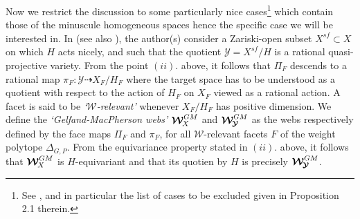 \documentclass[11pt]{amsart}
\newcommand{\sk}{\smallskip}
\begin{document}
Now we restrict the discussion to some particularly nice cases\footnote{See \cite{Skorobogatov}, and in particular the list of cases to be excluded given in Proposition 2.1 therein.} which contain those of the minuscule homogeneous spaces hence the specific case we will be interested in.  In \cite{Skorobogatov} (see also \cite{SerganovaSkorobogatov}), the author(s) consider a Zariski-open subset $X^{sf}\subset X$ on which $H$ acts nicely, and such that the quotient $\boldsymbol{\mathcal Y}=X^{sf}/H$ is a rational quasi-projective variety.  From the point $(ii).$ above, it follows that $\Pi_F$ descends to a rational map $\pi_F: \boldsymbol{\mathcal Y} \dashrightarrow X_F/H_F$ where the target space has to be understood as a quotient 
with respect to the action of $H_F$ on $X_F$ viewed as a rational action.  A facet is said to be {\it `${\mathcal W}$-relevant'} whenever $X_F/H_F$ has positive dimension. We define the {\it `Gelfand-MacPherson webs'} $\boldsymbol{\mathcal{W}}^{GM}_{\hspace{-0.05cm}X}$ and $\boldsymbol{\mathcal{W}}^{GM}_{\hspace{-0.05cm}\boldsymbol{\mathcal Y}}$ as the webs  respectively defined by the face maps $\Pi_F$ and $\pi_F$, for all ${\mathcal W}$-relevant facets $F$ of the weight polytope $\Delta_{G,P}$. From the equivariance property stated in $(ii).$ above, it follows that $\boldsymbol{\mathcal{W}}^{GM}_{\hspace{-0.05cm}X}$ is $H$-equivariant and that its quotien by $H$ is precisely $\boldsymbol{\mathcal{W}}^{GM}_{\hspace{-0.05cm}\boldsymbol{\mathcal Y}}$. 
\sk 
\end{document}
